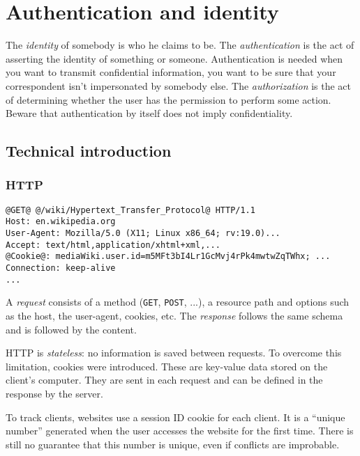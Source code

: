 \section{Authentication and identity}

The \emph{identity} of somebody is who he claims to be.
The \emph{authentication} is the act of asserting the identity of something or
someone.
Authentication is needed when you want to transmit confidential
information, you want to be sure that your correspondent isn't
impersonated by somebody else.
The \emph{authorization} is the act of determining whether the user has the
permission to perform some action.
Beware that authentication by itself does not imply confidentiality.

\subsection{Technical introduction}

\subsubsection*{HTTP}

\begin{lstlisting}[style=beamer,
	caption={HTTP Request Example}]
@GET@ @/wiki/Hypertext_Transfer_Protocol@ HTTP/1.1
Host: en.wikipedia.org
User-Agent: Mozilla/5.0 (X11; Linux x86_64; rv:19.0)...
Accept: text/html,application/xhtml+xml,...
@Cookie@: mediaWiki.user.id=m5MFt3bI4Lr1GcMvj4rPk4mwtwZqTWhx; ...
Connection: keep-alive
...
\end{lstlisting}

A \emph{request} consists of a method (\texttt{GET}, \texttt{POST}, ...), a
resource path and options such as the host, the user-agent, cookies, etc.
The \emph{response} follows the same schema and is followed by the content.

HTTP is \emph{stateless}: no information is saved between requests.
To overcome this limitation, cookies were introduced. These are key-value data
stored on the client's computer. They are sent in each request and can be
defined in the response by the server.

To track clients, websites use a session ID cookie for each client.
It is a ``unique number'' generated when the user accesses the website for the
first time. There is still no guarantee that this number is unique, even if
conflicts are improbable.
\newline
